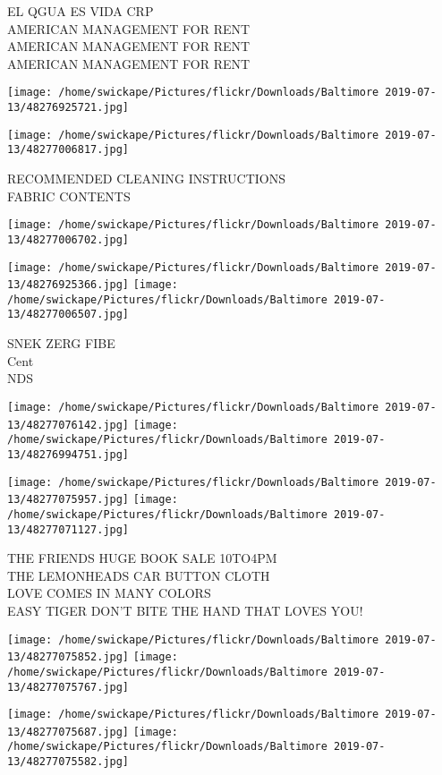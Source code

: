 \documentclass[10pt,letterpaper]{article}
\begin{document}
EL QGUA ES VIDA CRP\\
AMERICAN MANAGEMENT FOR RENT\\
AMERICAN MANAGEMENT FOR RENT\\
AMERICAN MANAGEMENT FOR RENT
\pagebreak

\texttt{[image: /home/swickape/Pictures/flickr/Downloads/Baltimore 2019-07-13/48276925721.jpg]}

\vspace{0.25in}
\texttt{[image: /home/swickape/Pictures/flickr/Downloads/Baltimore 2019-07-13/48277006817.jpg]}

RECOMMENDED CLEANING INSTRUCTIONS\\
FABRIC CONTENTS
\pagebreak

\texttt{[image: /home/swickape/Pictures/flickr/Downloads/Baltimore 2019-07-13/48277006702.jpg]}

\vspace{0.25in}
\texttt{[image: /home/swickape/Pictures/flickr/Downloads/Baltimore 2019-07-13/48276925366.jpg]}
\texttt{[image: /home/swickape/Pictures/flickr/Downloads/Baltimore 2019-07-13/48277006507.jpg]}

SNEK ZERG FIBE\\
Cent\\
NDS
\pagebreak

\texttt{[image: /home/swickape/Pictures/flickr/Downloads/Baltimore 2019-07-13/48277076142.jpg]}
\texttt{[image: /home/swickape/Pictures/flickr/Downloads/Baltimore 2019-07-13/48276994751.jpg]}

\texttt{[image: /home/swickape/Pictures/flickr/Downloads/Baltimore 2019-07-13/48277075957.jpg]}
\texttt{[image: /home/swickape/Pictures/flickr/Downloads/Baltimore 2019-07-13/48277071127.jpg]}

THE FRIENDS HUGE BOOK SALE 10TO4PM\\
THE LEMONHEADS CAR BUTTON CLOTH\\
LOVE COMES IN MANY COLORS\\
EASY TIGER DON'T BITE THE HAND THAT LOVES YOU!
\pagebreak

\texttt{[image: /home/swickape/Pictures/flickr/Downloads/Baltimore 2019-07-13/48277075852.jpg]}
\texttt{[image: /home/swickape/Pictures/flickr/Downloads/Baltimore 2019-07-13/48277075767.jpg]}

\texttt{[image: /home/swickape/Pictures/flickr/Downloads/Baltimore 2019-07-13/48277075687.jpg]}
\texttt{[image: /home/swickape/Pictures/flickr/Downloads/Baltimore 2019-07-13/48277075582.jpg]}
\end{document}
